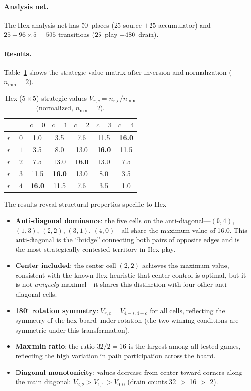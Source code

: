 \documentclass[11pt,a4paper]{article}
\begin{document}
\paragraph{Analysis net.}
The Hex analysis net has 50~places ($25$ source $+ 25$ accumulator) and $25 + 96 \times 5 = 505$ transitions ($25$~play $+ 480$~drain).

\paragraph{Results.}
Table~\ref{tab:hex} shows the strategic value matrix after inversion and normalization ($n_{\min} = 2$).

\begin{table}[ht]
\centering
\caption{Hex ($5 \times 5$) strategic values $V_{r,c} = n_{r,c} / n_{\min}$ (normalized, $n_{\min} = 2$).}
\label{tab:hex}
\begin{tabular}{@{}c|ccccc@{}}
\toprule
& $c=0$ & $c=1$ & $c=2$ & $c=3$ & $c=4$ \\
\midrule
$r=0$ & 1.0 & 3.5 & 7.5 & 11.5 & \textbf{16.0} \\
$r=1$ & 3.5 & 8.0 & 13.0 & \textbf{16.0} & 11.5 \\
$r=2$ & 7.5 & 13.0 & \textbf{16.0} & 13.0 & 7.5 \\
$r=3$ & 11.5 & \textbf{16.0} & 13.0 & 8.0 & 3.5 \\
$r=4$ & \textbf{16.0} & 11.5 & 7.5 & 3.5 & 1.0 \\
\bottomrule
\end{tabular}
\end{table}

The results reveal structural properties specific to Hex:
\begin{itemize}
  \item \textbf{Anti-diagonal dominance}: the five cells on the anti-diagonal---$(0,4)$, $(1,3)$, $(2,2)$, $(3,1)$, $(4,0)$---all share the maximum value of 16.0.
  This anti-diagonal is the ``bridge'' connecting both pairs of opposite edges and is the most strategically contested territory in Hex play.
  \item \textbf{Center included}: the center cell $(2,2)$ achieves the maximum value, consistent with the known Hex heuristic that center control is optimal, but it is not \emph{uniquely} maximal---it shares this distinction with four other anti-diagonal cells.
  \item \textbf{180$^\circ$ rotation symmetry}: $V_{r,c} = V_{4-r, 4-c}$ for all cells, reflecting the symmetry of the hex board under rotation (the two winning conditions are symmetric under this transformation).
  \item \textbf{Max:min ratio}: the ratio $32/2 = 16$ is the largest among all tested games, reflecting the high variation in path participation across the board.
  \item \textbf{Diagonal monotonicity}: values decrease from center toward corners along the main diagonal: $V_{2,2} > V_{1,1} > V_{0,0}$ (drain counts 32 $>$ 16 $>$ 2).
\end{itemize}
\end{document}
